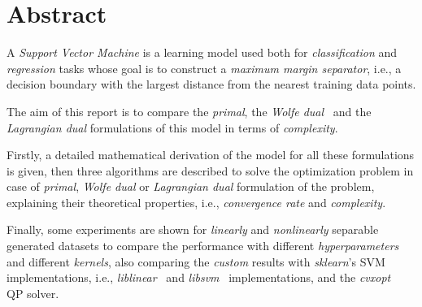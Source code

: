 \section{Abstract}

A \emph{Support Vector Machine} is a learning model used both for \emph{classification} and \emph{regression} tasks whose goal is to construct a \emph{maximum margin separator}, i.e., a decision boundary with the largest distance from the nearest training data points.

The aim of this report is to compare the \emph{primal}, the \emph{Wolfe dual}~\cite{fletcher2009support} and the \emph{Lagrangian dual} formulations of this model in terms of \emph{complexity}.

Firstly, a detailed mathematical derivation of the model for all these formulations is given, then three algorithms are described to solve the optimization problem in case of \emph{primal}, \emph{Wolfe dual} or \emph{Lagrangian dual} formulation of the problem, explaining their theoretical properties, i.e., \emph{convergence rate} and \emph{complexity}.

Finally, some experiments are shown for \emph{linearly} and \emph{nonlinearly} separable generated datasets to compare the performance with different \emph{hyperparameters} and different \emph{kernels}, also comparing the \emph{custom} results with \emph{sklearn}'s SVM implementations, i.e., \emph{liblinear}~\cite{fan2008liblinear} and \emph{libsvm}~\cite{chang2011libsvm} implementations, and the \emph{cvxopt}~\cite{vandenberghe2010cvxopt} QP solver.